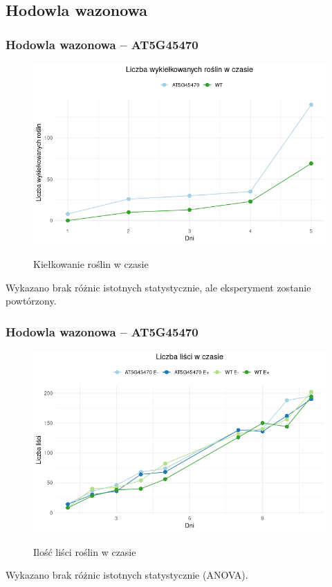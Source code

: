 \documentclass{beamer}
\begin{document}
\subsection{Hodowla wazonowa}
\begin{frame}
    \frametitle{Hodowla wazonowa -- AT5G45470}
    \begin{figure}
        \centering
        \includegraphics[scale=0.4]{kielkowanie1.png}\\
        \caption*\hfill{\scriptsize Kiełkowanie roślin w czasie}%
    \end{figure}
    \small Wykazano brak różnic istotnych statystycznie, ale eksperyment zostanie powtórzony.
\end{frame}

\begin{frame}
    \frametitle{Hodowla wazonowa -- AT5G45470}
    \begin{figure}
        \centering
        \includegraphics[scale=0.5]{liscie1.png}\\
        \caption*\hfill{\scriptsize Ilość liści roślin w czasie}%
    \end{figure}
    \small Wykazano brak różnic istotnych statystycznie (ANOVA).
\end{frame}
\end{document}
